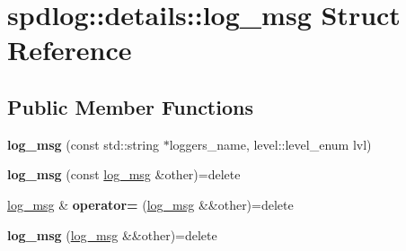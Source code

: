 \hypertarget{structspdlog_1_1details_1_1log__msg}{}\section{spdlog\+:\+:details\+:\+:log\+\_\+msg Struct Reference}
\label{structspdlog_1_1details_1_1log__msg}
\subsection*{Public Member Functions}
\begin{DoxyCompactItemize}
\item 
{\bfseries log\+\_\+msg} (const std\+::string $\ast$loggers\+\_\+name, level\+::level\+\_\+enum lvl)\hypertarget{structspdlog_1_1details_1_1log__msg_a70dc787cddfaf8e678f0fa135a4e5525}{}\label{structspdlog_1_1details_1_1log__msg_a70dc787cddfaf8e678f0fa135a4e5525}

\item 
{\bfseries log\+\_\+msg} (const \hyperlink{structspdlog_1_1details_1_1log__msg}{log\+\_\+msg} \&other)=delete\hypertarget{structspdlog_1_1details_1_1log__msg_a51f3ba00f2c47f37ed2a4692c8b028b2}{}\label{structspdlog_1_1details_1_1log__msg_a51f3ba00f2c47f37ed2a4692c8b028b2}

\item 
\hyperlink{structspdlog_1_1details_1_1log__msg}{log\+\_\+msg} \& {\bfseries operator=} (\hyperlink{structspdlog_1_1details_1_1log__msg}{log\+\_\+msg} \&\&other)=delete\hypertarget{structspdlog_1_1details_1_1log__msg_a48a0c8c70f176b915487ec4511781c46}{}\label{structspdlog_1_1details_1_1log__msg_a48a0c8c70f176b915487ec4511781c46}

\item 
{\bfseries log\+\_\+msg} (\hyperlink{structspdlog_1_1details_1_1log__msg}{log\+\_\+msg} \&\&other)=delete\hypertarget{structspdlog_1_1details_1_1log__msg_aaedee42f7e295700b9ad8a5378997a70}{}\label{structspdlog_1_1details_1_1log__msg_aaedee42f7e295700b9ad8a5378997a70}

\end{DoxyCompactItemize}
